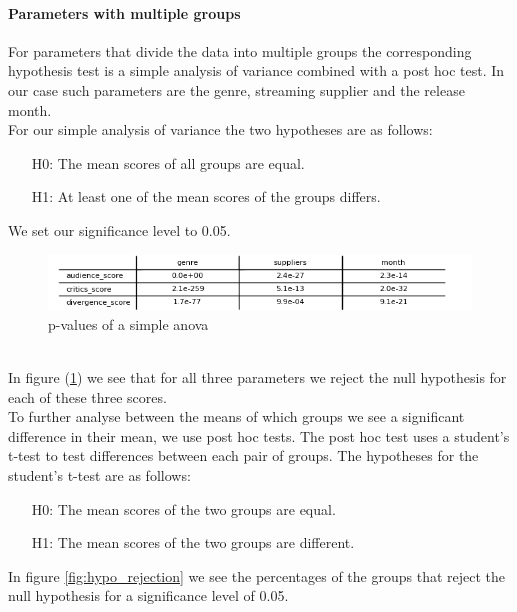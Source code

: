 \documentclass{article}
\begin{document}
    \paragraph{Parameters with multiple groups}
    For parameters that divide the data into multiple groups the corresponding hypothesis test is a simple analysis of variance combined with a post hoc test. In our case such parameters are the genre, streaming supplier and the release month.\\
    For our simple analysis of variance the two hypotheses are as follows:
    \begin{enumerate}
        \item[H0:] The mean scores of all groups are equal.
        \item[H1:] At least one of the mean scores of the groups differs.
    \end{enumerate}
    We set our significance level to 0.05.\\
    \noindent
    \begin{figure}[H]
        \centering
        \includegraphics[width=1\textwidth]{imgs/var_p.png}
        \caption{p-values of a simple anova}
        \label{fig:variance_p}
    \end{figure}\\
    In figure (\ref{fig:variance_p}) we see that for all three parameters we reject the null hypothesis for each of these three scores.\\
    To further analyse between the means of which groups we see a significant difference in their mean, we use post hoc tests. The post hoc test uses a student's t-test to test differences between each pair of groups. The hypotheses for the student's t-test are as follows:
    \begin{enumerate}
        \item[H0:] The mean scores of the two groups are equal.
        \item[H1:] The mean scores of the two groups are different.
    \end{enumerate}
    In figure \ref{fig:hypo_rejection} we see the percentages of the groups that reject the null hypothesis for a significance level of 0.05.
\end{document}

